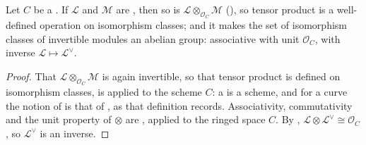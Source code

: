 \begin{lemma}
\label{lem:pcb-pic-group}
Let \(C\) be a .  If \(\mathcal L\)
and \(\mathcal M\) are
, then so is \(\mathcal L\otimes_{\mathcal
O_C}\mathcal M\) (), so tensor
product is a well-defined operation on isomorphism classes; and it
makes the set of isomorphism classes of invertible modules an abelian
group: associative with unit \(\mathcal O_C\), with inverse
\(\mathcal L\mapsto\mathcal L^{\vee}\).
\end{lemma}
\begin{proof}
That \(\mathcal L\otimes_{\mathcal O_C}\mathcal M\) is again
invertible, so that tensor product is defined on isomorphism classes,
is  applied to the scheme \(C\):
a  is a scheme, and for a curve the
notion of  is that of
, as that definition records.
Associativity, commutativity and the unit property of \(\otimes\) are
, applied to the ringed space \(C\).
By ,
\(\mathcal L\otimes\mathcal L^{\vee}\cong\mathcal O_C\), so
\(\mathcal L^{\vee}\) is an inverse.
\end{proof}

